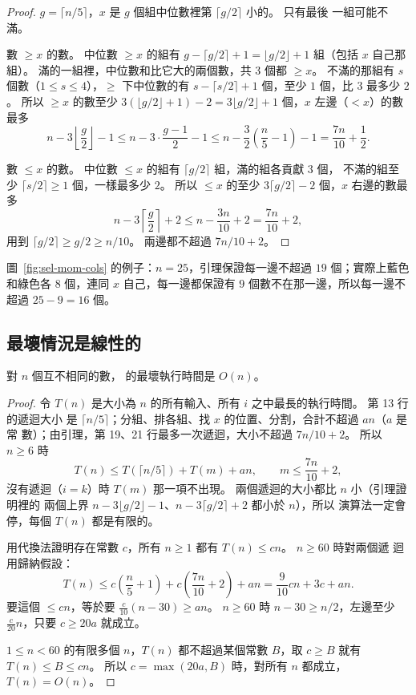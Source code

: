 \begin{proof}
$g = \lceil n/5 \rceil$，$x$ 是 $g$ 個組中位數裡第 $\lceil g/2 \rceil$ 小的。 只有最後
一組可能不滿。

數 $\ge x$ 的數。 中位數 $\ge x$ 的組有 $g - \lceil g/2 \rceil + 1 = \lfloor g/2 \rfloor + 1$
組（包括 $x$ 自己那組）。 滿的一組裡，中位數和比它大的兩個數，共 $3$ 個都 $\ge x$。
不滿的那組有 $s$ 個數（$1 \le s \le 4$），$\ge$ 下中位數的有 $s - \lceil s/2 \rceil + 1$
個，至少 $1$ 個，比 $3$ 最多少 $2$。 所以 $\ge x$ 的數至少
$3(\lfloor g/2 \rfloor + 1) - 2 = 3\lfloor g/2 \rfloor + 1$ 個，$x$ 左邊（$< x$）的數
最多
\[
n - 3\left\lfloor \frac{g}{2} \right\rfloor - 1
\le n - 3 \cdot \frac{g - 1}{2} - 1
\le n - \frac{3}{2}\left(\frac{n}{5} - 1\right) - 1
= \frac{7n}{10} + \frac{1}{2}.
\]

數 $\le x$ 的數。 中位數 $\le x$ 的組有 $\lceil g/2 \rceil$ 組，滿的組各貢獻 $3$ 個，
不滿的組至少 $\lceil s/2 \rceil \ge 1$ 個，一樣最多少 $2$。 所以 $\le x$ 的至少
$3\lceil g/2 \rceil - 2$ 個，$x$ 右邊的數最多
\[
n - 3\left\lceil \frac{g}{2} \right\rceil + 2 \le n - \frac{3n}{10} + 2 = \frac{7n}{10} + 2,
\]
用到 $\lceil g/2 \rceil \ge g/2 \ge n/10$。 兩邊都不超過 $7n/10 + 2$。
\end{proof}

圖~\ref{fig:sel-mom-cols} 的例子：$n = 25$，引理保證每一邊不超過 $19$ 個；實際上藍色
和綠色各 $8$ 個，連同 $x$ 自己，每一邊都保證有 $9$ 個數不在那一邊，所以每一邊不超過
$25 - 9 = 16$ 個。

\subsection{最壞情況是線性的}

\begin{theorem}
\label{thm:sel-mom}
對 $n$ 個互不相同的數， 的最壞執行時間是 $O(n)$。
\end{theorem}

\begin{proof}
令 $T(n)$ 是大小為 $n$ 的所有輸入、所有 $i$ 之中最長的執行時間。 第 13 行的遞迴大小
是 $\lceil n/5 \rceil$；分組、排各組、找 $x$ 的位置、分割，合計不超過 $an$（$a$ 是常
數）；由引理，第 19、21 行最多一次遞迴，大小不超過 $7n/10 + 2$。 所以 $n \ge 6$ 時
\[
T(n) \le T(\lceil n/5 \rceil) + T(m) + an, \qquad m \le \frac{7n}{10} + 2,
\]
沒有遞迴（$i = k$）時 $T(m)$ 那一項不出現。 兩個遞迴的大小都比 $n$ 小（引理證明裡的
兩個上界 $n - 3\lfloor g/2 \rfloor - 1$、$n - 3\lceil g/2 \rceil + 2$ 都小於 $n$），所以
演算法一定會停，每個 $T(n)$ 都是有限的。

用代換法證明存在常數 $c$，所有 $n \ge 1$ 都有 $T(n) \le cn$。 $n \ge 60$ 時對兩個遞
迴用歸納假設：
\[
T(n) \le c\left(\frac{n}{5} + 1\right) + c\left(\frac{7n}{10} + 2\right) + an
= \frac{9}{10}cn + 3c + an.
\]
要這個 $\le cn$，等於要 $\frac{c}{10}(n - 30) \ge an$。 $n \ge 60$ 時
$n - 30 \ge n/2$，左邊至少 $\frac{c}{20} n$，只要 $c \ge 20a$ 就成立。

$1 \le n < 60$ 的有限多個 $n$，$T(n)$ 都不超過某個常數 $B$，取 $c \ge B$ 就有
$T(n) \le B \le cn$。 所以 $c = \max(20a, B)$ 時，對所有 $n$ 都成立，$T(n) = O(n)$。
\end{proof}

